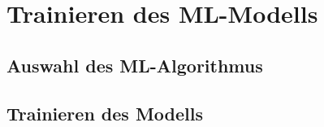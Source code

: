 \section{Trainieren des ML-Modells}

\subsection{Auswahl des ML-Algorithmus}

\subsection{Trainieren des Modells}